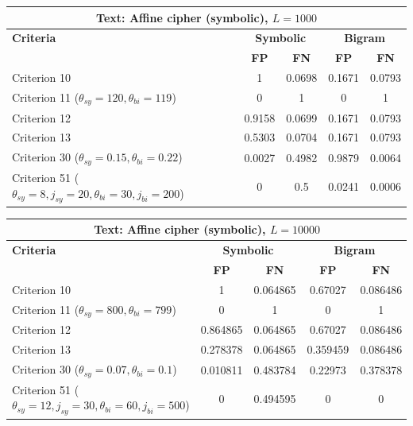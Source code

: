 \begin{center}
\renewcommand{\arraystretch}{1.2}
\setlength{\tabcolsep}{6pt}
\begin{tabular}{|l||c|c||c|c|}
\hline
\multicolumn{5}{|c|}{\textbf{Text: Affine cipher (symbolic), $L=1000$}} \\
\hline
\textbf{Criteria} & \multicolumn{2}{c||}{\textbf{Symbolic}} & \multicolumn{2}{c|}{\textbf{Bigram}} \\
\hline
 & \textbf{FP} & \textbf{FN} & \textbf{FP} & \textbf{FN} \\
\hline
Criterion 10 & 1 & 0.0698 & 0.1671 & 0.0793 \\
Criterion 11 ($\theta_{sy}=120, \theta_{bi}=119$) & 0 & 1 & 0 & 1 \\
Criterion 12 & 0.9158 & 0.0699 & 0.1671 & 0.0793 \\
Criterion 13 & 0.5303 & 0.0704 & 0.1671 & 0.0793 \\
Criterion 30 ($\theta_{sy}=0.15, \theta_{bi}=0.22$) & 0.0027 & 0.4982 & 0.9879 & 0.0064 \\
Criterion 51 ($\theta_{sy}=8, j_{sy}=20, \theta_{bi}=30, j_{bi}=200$) & 0 & 0.5 & 0.0241 & 0.0006 \\
\hline
\end{tabular}
\end{center}

\begin{center}
\renewcommand{\arraystretch}{1.2}
\setlength{\tabcolsep}{6pt}
\begin{tabular}{|l||c|c||c|c|}
\hline
\multicolumn{5}{|c|}{\textbf{Text: Affine cipher (symbolic), $L=10000$}} \\
\hline
\textbf{Criteria} & \multicolumn{2}{c||}{\textbf{Symbolic}} & \multicolumn{2}{c|}{\textbf{Bigram}} \\
\hline
 & \textbf{FP} & \textbf{FN} & \textbf{FP} & \textbf{FN} \\
\hline
Criterion 10 & 1 & 0.064865 & 0.67027 & 0.086486 \\
Criterion 11 ($\theta_{sy}=800, \theta_{bi}=799$) & 0 & 1 & 0 & 1 \\
Criterion 12 & 0.864865 & 0.064865 & 0.67027 & 0.086486 \\
Criterion 13 & 0.278378 & 0.064865 & 0.359459 & 0.086486 \\
Criterion 30 ($\theta_{sy}=0.07, \theta_{bi}=0.1$) & 0.010811 & 0.483784 & 0.22973 & 0.378378 \\
Criterion 51 ($\theta_{sy}=12, j_{sy}=30, \theta_{bi}=60, j_{bi}=500$) & 0 & 0.494595 & 0 & 0 \\
\hline
\end{tabular}
\end{center}

